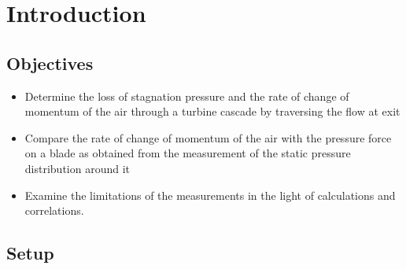 \documentclass{article}
\begin{document}
\title{}
\author{lwp26}
\date{October 2024}
\maketitle 

\section{Introduction}

\subsection{Objectives}
\begin{itemize}
    \item Determine the loss of stagnation pressure and the rate of
    change of momentum of the air through a turbine
    cascade by traversing the flow at exit
    \item Compare the rate of change of momentum of the air with
    the pressure force on a blade as obtained from the
    measurement of the static pressure distribution around it
    \item Examine the limitations of the measurements in the light
    of calculations and correlations.
\end{itemize}

\subsection{Setup}
\end{document}
